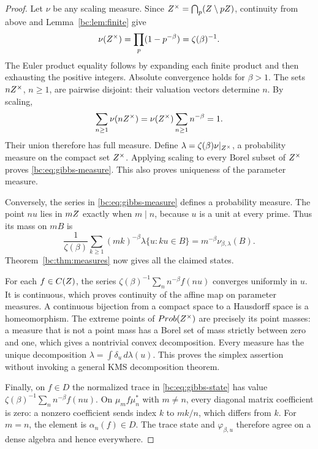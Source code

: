 \begin{proof}
Let \(\nu\) be any scaling measure. Since
\(Z^{\times}=\bigcap_p(Z\setminus pZ)\), continuity from above and
Lemma~\ref{bc:lem:finite} give
\[
 \nu(Z^{\times})=\prod_p(1-p^{-\beta})=\zeta(\beta)^{-1}.
\]
The Euler product equality follows by expanding each finite product and
then exhausting the positive integers. Absolute convergence holds for
\(\beta>1\). The sets \(nZ^{\times}\), \(n\geq1\), are pairwise disjoint:
their valuation vectors determine \(n\). By scaling,
\[
 \sum_{n\geq1}\nu(nZ^{\times})
 =\nu(Z^{\times})\sum_{n\geq1}n^{-\beta}=1.
\]
Their union therefore has full measure. Define
\(\lambda=\zeta(\beta)\nu|_{Z^{\times}}\), a probability measure on the
compact set \(Z^{\times}\). Applying scaling to every Borel subset of
\(Z^{\times}\) proves \eqref{bc:eq:gibbs-measure}. This also proves uniqueness
of the parameter measure.

Conversely, the series in \eqref{bc:eq:gibbs-measure} defines a probability
measure. The point \(nu\) lies in \(mZ\) exactly when \(m\mid n\),
because \(u\) is a unit at every prime. Thus its mass on \(mB\) is
\[
 \frac1{\zeta(\beta)}\sum_{k\geq1}(mk)^{-\beta}
          \lambda\{u:ku\in B\}
 =m^{-\beta}\nu_{\beta,\lambda}(B).
\]
Theorem~\ref{bc:thm:measures} now gives all the claimed states.

For each \(f\in C(Z)\), the series
\(\zeta(\beta)^{-1}\sum_n n^{-\beta}f(nu)\) converges uniformly in
\(u\). It is continuous, which proves continuity of the affine map
on parameter measures. A continuous bijection from a compact space to
a Hausdorff space is a homeomorphism. The extreme points of
\(Prob(Z^{\times})\) are precisely its point masses: a measure that is not
a point mass has a Borel set of mass strictly between zero and one,
which gives a nontrivial convex decomposition. Every measure has the
unique decomposition \(\lambda=\int\delta_u\,d\lambda(u)\).
This proves the simplex assertion without invoking a general KMS
decomposition theorem.

Finally, on \(f\in D\) the normalized trace in
\eqref{bc:eq:gibbs-state} has value
\(\zeta(\beta)^{-1}\sum_nn^{-\beta}f(nu)\).
On \(\mu_mf\mu_n^*\) with \(m\ne n\), every diagonal matrix
coefficient is zero: a nonzero coefficient sends index \(k\) to
\(mk/n\), which differs from \(k\). For \(m=n\), the element is
\(\alpha_n(f)\in D\). The trace state and \(\varphi_{\beta,u}\)
therefore agree on a dense algebra and hence everywhere.
\end{proof}

